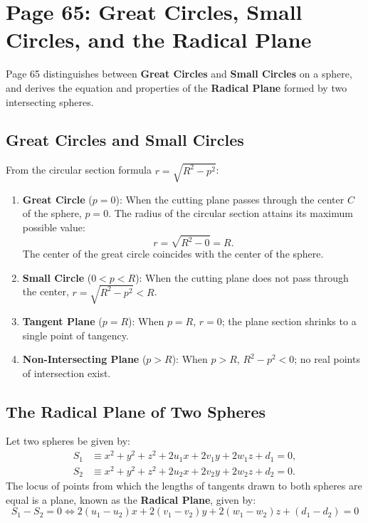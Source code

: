 \section{Page 65: Great Circles, Small Circles, and the Radical Plane}
\label{sec:page65}

\begin{conceptbox}
Page 65 distinguishes between \textbf{Great Circles} and \textbf{Small Circles} on a sphere, and derives the equation and properties of the \textbf{Radical Plane} formed by two intersecting spheres.
\end{conceptbox}

\subsection{Great Circles and Small Circles}
From the circular section formula $r = \sqrt{R^2 - p^2}$:
\begin{enumerate}
    \item \textbf{Great Circle} ($p = 0$):
    When the cutting plane passes through the center $C$ of the sphere, $p = 0$.
    The radius of the circular section attains its maximum possible value:
    \begin{equation}
        r = \sqrt{R^2 - 0} = R.
    \end{equation}
    The center of the great circle coincides with the center of the sphere.
    \item \textbf{Small Circle} ($0 < p < R$):
    When the cutting plane does not pass through the center, $r = \sqrt{R^2 - p^2} < R$.
    \item \textbf{Tangent Plane} ($p = R$):
    When $p = R$, $r = 0$; the plane section shrinks to a single point of tangency.
    \item \textbf{Non-Intersecting Plane} ($p > R$):
    When $p > R$, $R^2 - p^2 < 0$; no real points of intersection exist.
\end{enumerate}

\subsection{The Radical Plane of Two Spheres}
\begin{theorembox}
Let two spheres be given by:
\begin{align}
    S_1 &\equiv x^2 + y^2 + z^2 + 2u_1 x + 2v_1 y + 2w_1 z + d_1 = 0, \label{eq:p65_s1} \\
    S_2 &\equiv x^2 + y^2 + z^2 + 2u_2 x + 2v_2 y + 2w_2 z + d_2 = 0. \label{eq:p65_s2}
\end{align}
The locus of points from which the lengths of tangents drawn to both spheres are equal is a plane, known as the \textbf{Radical Plane}, given by:
\begin{equation}
    \boxed{S_1 - S_2 = 0 \iff 2(u_1 - u_2)x + 2(v_1 - v_2)y + 2(w_1 - w_2)z + (d_1 - d_2) = 0}
\end{equation}
\end{theorembox}

